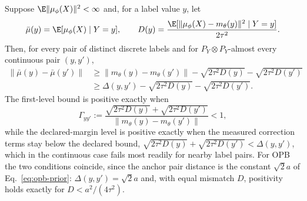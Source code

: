 \begin{theorem}
\label{thm:pgib-separation}
Suppose $\E\|\mu_\phi(X)\|^2<\infty$ and, for a label value $y$, let
\begin{equation}
\bar\mu(y)=\E[\mu_\phi(X)\mid Y=y],\qquad
D(y)=\frac{\E[\|\mu_\phi(X)-m_\theta(y)\|^2\mid Y=y]}{2\tau^2}.
\label{eq:pgib-class-rate}
\end{equation}
Then, for every pair of distinct discrete labels and for $P_Y\otimes P_Y$-almost
every continuous pair $(y,y')$,
\begin{equation}
\begin{aligned}
\|\bar\mu(y)-\bar\mu(y')\|
&\ge\|m_\theta(y)-m_\theta(y')\|-\sqrt{2\tau^2D(y)}-\sqrt{2\tau^2D(y')}\\
&\ge\Delta(y,y')-\sqrt{2\tau^2D(y)}-\sqrt{2\tau^2D(y')}.
\end{aligned}
\label{eq:pgib-separation}
\end{equation}
The first-level bound is positive exactly when
\begin{equation}
\Gamma_{yy'}:=\frac{\sqrt{2\tau^2D(y)}+\sqrt{2\tau^2D(y')}}
{\|m_\theta(y)-m_\theta(y')\|}<1,
\label{eq:separation-tightness-ratio}
\end{equation}
while the declared-margin level is positive exactly when the measured correction
terms stay below the declared bound,
$\sqrt{2\tau^2D(y)}+\sqrt{2\tau^2D(y')}<\Delta(y,y')$, which in the
continuous case fails most readily for nearby label pairs. For OPB the two
conditions coincide, since the anchor pair distance is the constant $\sqrt2a$ of
Eq.~\eqref{eq:opb-prior}: $\Delta(y,y')=\sqrt2a$ and, with equal mismatch $D$,
positivity holds exactly for $D<a^2/(4\tau^2)$.
\end{theorem}

